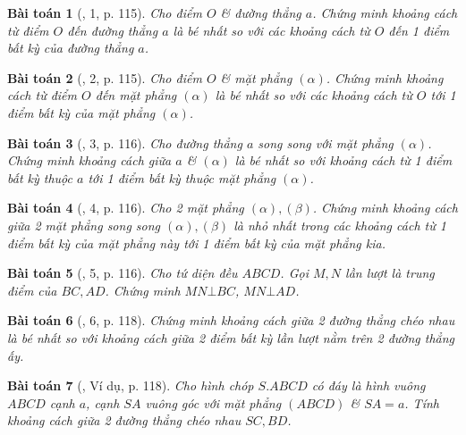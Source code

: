 \documentclass{article}
\numberwithin{equation}{section}
\newtheorem{baitoan}{Bài toán}
\begin{document}
\begin{baitoan}[\cite{SGK_Toan_11_hinh_hoc_co_ban}, 1, p. 115]
	Cho điểm $O$ \& đường thẳng $a$. Chứng minh khoảng cách từ điểm $O$ đến đường thẳng $a$ là bé nhất so với các khoảng cách từ $O$ đến 1 điểm bất kỳ của đường thẳng $a$.
\end{baitoan}

\begin{baitoan}[\cite{SGK_Toan_11_hinh_hoc_co_ban}, 2, p. 115]
	Cho điểm $O$ \& mặt phẳng $(\alpha)$. Chứng minh khoảng cách từ điểm $O$ đến mặt phẳng $(\alpha)$ là bé nhất so với các khoảng cách từ $O$ tới 1 điểm bất kỳ của mặt phẳng $(\alpha)$.
\end{baitoan}

\begin{baitoan}[\cite{SGK_Toan_11_hinh_hoc_co_ban}, 3, p. 116]
	Cho đường thẳng $a$ song song với mặt phẳng $(\alpha)$. Chứng minh khoảng cách giữa $a$ \& $(\alpha)$ là bé nhất so với khoảng cách từ 1 điểm bất kỳ thuộc $a$ tới 1 điểm bất kỳ thuộc mặt phẳng $(\alpha)$.
\end{baitoan}

\begin{baitoan}[\cite{SGK_Toan_11_hinh_hoc_co_ban}, 4, p. 116]
	Cho 2 mặt phẳng $(\alpha),(\beta)$. Chứng minh khoảng cách giữa 2 mặt phẳng song song $(\alpha),(\beta)$ là nhỏ nhất trong các khoảng cách từ 1 điểm bất kỳ của mặt phẳng này tới 1 điểm bất kỳ của mặt phẳng kia.
\end{baitoan}

\begin{baitoan}[\cite{SGK_Toan_11_hinh_hoc_co_ban}, 5, p. 116]
	Cho tứ diện đều $ABCD$. Gọi $M,N$ lần lượt là trung điểm của $BC,AD$. Chứng minh $MN\bot BC$, $MN\bot AD$.
\end{baitoan}

\begin{baitoan}[\cite{SGK_Toan_11_hinh_hoc_co_ban}, 6, p. 118]
	Chứng minh khoảng cách giữa 2 đường thẳng chéo nhau là bé nhất so với khoảng cách giữa 2 điểm bất kỳ lần lượt nằm trên 2 đường thẳng ấy.
\end{baitoan}

\begin{baitoan}[\cite{SGK_Toan_11_hinh_hoc_co_ban}, Ví dụ, p. 118]
	Cho hình chóp $S.ABCD$ có đáy là hình vuông $ABCD$ cạnh $a$, cạnh $SA$ vuông góc với mặt phẳng $(ABCD)$ \& $SA = a$. Tính khoảng cách giữa 2 đường thẳng chéo nhau $SC,BD$.
\end{baitoan}
\end{document}

